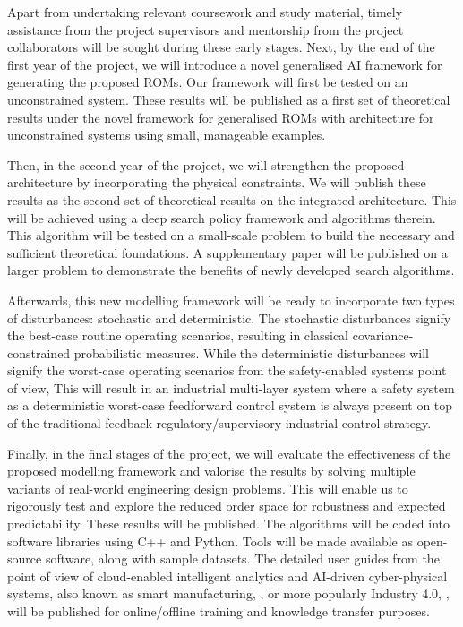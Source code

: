 \documentclass[oneside,11pt,a4paper]{article}
\begin{document}
Apart from undertaking relevant coursework and study material, timely assistance from the project supervisors and mentorship from the project collaborators will be sought during these early stages. Next, by the end of the first year of the project, we will introduce a novel generalised AI framework for generating the proposed ROMs. Our framework will first be tested on an unconstrained system. These results will be published as a first set of theoretical results under the novel framework for generalised ROMs with architecture for unconstrained systems using small, manageable examples.

Then, in the second year of the project, we will strengthen the proposed architecture by incorporating the physical constraints. We will publish these results as the second set of theoretical results on the integrated architecture. This will be achieved using a deep search policy framework and algorithms therein. This algorithm will be tested on a small-scale problem to build the necessary and sufficient theoretical foundations. A supplementary paper will be published on a larger problem to demonstrate the benefits of newly developed search algorithms.

Afterwards, this new modelling framework will be ready to incorporate two types of disturbances: stochastic and deterministic. The stochastic disturbances signify the best-case routine operating scenarios, resulting in classical covariance-constrained probabilistic measures. While the deterministic disturbances will signify the worst-case operating scenarios from the safety-enabled systems point of view, This will result in an industrial multi-layer system where a safety system as a deterministic worst-case feedforward control system is always present on top of the traditional feedback regulatory/supervisory industrial control strategy.

Finally, in the final stages of the project, we will evaluate the effectiveness of the proposed modelling framework and valorise the results by solving multiple variants of real-world engineering design problems. This will enable us to rigorously test and explore the reduced order space for robustness and expected predictability. These results will be published. The algorithms will be coded into software libraries using C++ and Python. Tools will be made available as open-source software, along with sample datasets. The detailed user guides from the point of view of cloud-enabled intelligent analytics and AI-driven cyber-physical systems, also known as smart manufacturing, \cite{davis2015smart,davis2012smart, botcha2018implementing}, or more popularly Industry 4.0, \cite{liu2017industry, zheng2018smart, ghobakhloo2020industry}, will be published for online/offline training and knowledge transfer purposes.
\end{document}
